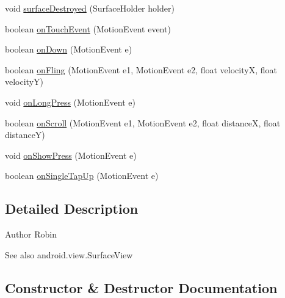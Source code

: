 \begin{DoxyCompactItemize}
void \hyperlink{classswp_1_1tuilmenau_1_1carduinodroid_1_1controller_1_1_camera_surface_ad8a4854496d3186224ff6a86ae1c343c}{surface\+Destroyed} (Surface\+Holder holder)
\item 
boolean \hyperlink{classswp_1_1tuilmenau_1_1carduinodroid_1_1controller_1_1_camera_surface_afd3cacc6c400724abf5c5ded882363b8}{on\+Touch\+Event} (Motion\+Event event)
\item 
boolean \hyperlink{classswp_1_1tuilmenau_1_1carduinodroid_1_1controller_1_1_camera_surface_af54a5e01c5f20ac8212954280c48785a}{on\+Down} (Motion\+Event e)
\item 
boolean \hyperlink{classswp_1_1tuilmenau_1_1carduinodroid_1_1controller_1_1_camera_surface_a2c2c30bc28a1b183bfc3e0492ea1be44}{on\+Fling} (Motion\+Event e1, Motion\+Event e2, float velocity\+X, float velocity\+Y)
\item 
void \hyperlink{classswp_1_1tuilmenau_1_1carduinodroid_1_1controller_1_1_camera_surface_a99ee0d96896cfae8a3be19ce48d61926}{on\+Long\+Press} (Motion\+Event e)
\item 
boolean \hyperlink{classswp_1_1tuilmenau_1_1carduinodroid_1_1controller_1_1_camera_surface_a1cc9dc5983675f90c16b0f64cb322e29}{on\+Scroll} (Motion\+Event e1, Motion\+Event e2, float distance\+X, float distance\+Y)
\item 
void \hyperlink{classswp_1_1tuilmenau_1_1carduinodroid_1_1controller_1_1_camera_surface_ab738bf7ace1ef2c497c39984bb585369}{on\+Show\+Press} (Motion\+Event e)
\item 
boolean \hyperlink{classswp_1_1tuilmenau_1_1carduinodroid_1_1controller_1_1_camera_surface_acc22d3ff51d7099601473ce0a26f7ab5}{on\+Single\+Tap\+Up} (Motion\+Event e)
\end{DoxyCompactItemize}


\subsection{Detailed Description}
\begin{DoxyAuthor}{Author}
Robin 
\end{DoxyAuthor}
\begin{DoxySeeAlso}{See also}
android.\+view.\+Surface\+View 
\end{DoxySeeAlso}


\subsection{Constructor \& Destructor Documentation}
\hypertarget{classswp_1_1tuilmenau_1_1carduinodroid_1_1controller_1_1_camera_surface_a1c578c6418952fd170916dad67e26152}{}

